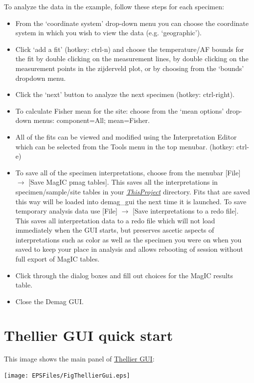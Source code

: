 \documentclass[11pt]{book}
\begin{document}
{To analyze the data in the example, follow these steps for each specimen:
\begin{itemize}
\item From the `coordinate system' drop-down menu you can choose the coordinate system in which you wish to view the data (e.g.  `geographic').
\item Click `add a fit' (hotkey: ctrl-n) and choose the temperature/AF bounds for the fit by double clicking on the measurement lines, by double clicking on the measurement points in the zijderveld plot, or by choosing from the `bounds' dropdown menu.
\item Click the `next' button to analyze the next specimen (hotkey: ctrl-right).
\item To calculate  Fisher mean for the site: choose from the `mean options' drop-down menus: component=All; mean=Fisher.
\item All of the fits can be viewed and modified using the Interpretation Editor which can be selected from the Tools menu in the top menubar. (hotkey: ctrl-e)
\item To save all of the specimen interpretations, choose from the menubar [File] $\rightarrow$ [Save MagIC pmag tables]. This saves all the interpretations in specimen/sample/site tables in your \href{#Project_Directory}{\it ThisProject} directory. Fits that are saved this way will be loaded into demag\_gui the next time it is launched. To save temporary analysis data use [File] $\rightarrow$ [Save interpretations to a redo file]. This saves all interpretation data to a redo file which will not load immediately when the GUI starts, but preserves ascetic aspects of interpretations such as color as well as the specimen you were on when you saved to keep your place in analysis and allows rebooting of session without full export of MagIC tables.
\item Click through the dialog boxes and fill out choices for the MagIC results table.
\item Close the Demag GUI.
\end{itemize}


\section{Thellier GUI quick start}
This image shows the main panel of \href{#ThellierGUI}{Thellier GUI}:

\texttt{[image: EPSFiles/FigThellierGui.eps]}

}
\end{document}
